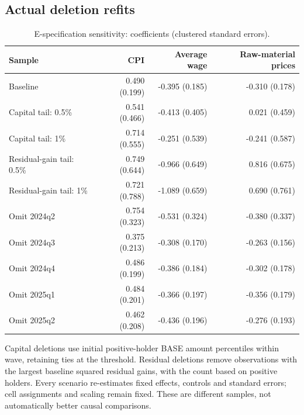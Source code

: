 \subsection{Actual deletion refits}
\begin{table}[H]
\centering
\small
\setlength{\tabcolsep}{4pt}
\caption{E-specification sensitivity: coefficients (clustered standard errors).}
\begin{tabular}{lrrr}
\toprule
Sample & CPI & Average wage & Raw-material prices \\
\midrule
Baseline & 0.490 (0.199) & -0.395 (0.185) & -0.310 (0.178) \\
Capital tail: 0.5\% & 0.541 (0.466) & -0.413 (0.405) & 0.021 (0.459) \\
Capital tail: 1\% & 0.714 (0.555) & -0.251 (0.539) & -0.241 (0.587) \\
Residual-gain tail: 0.5\% & 0.749 (0.644) & -0.966 (0.649) & 0.816 (0.675) \\
Residual-gain tail: 1\% & 0.721 (0.788) & -1.089 (0.659) & 0.690 (0.761) \\
Omit 2024q2 & 0.754 (0.323) & -0.531 (0.324) & -0.380 (0.337) \\
Omit 2024q3 & 0.375 (0.213) & -0.308 (0.170) & -0.263 (0.156) \\
Omit 2024q4 & 0.486 (0.199) & -0.386 (0.184) & -0.302 (0.178) \\
Omit 2025q1 & 0.484 (0.201) & -0.366 (0.197) & -0.356 (0.179) \\
Omit 2025q2 & 0.462 (0.208) & -0.436 (0.196) & -0.276 (0.193) \\
\bottomrule
\end{tabular}
\end{table}
\noindent\small Capital deletions use initial positive-holder BASE amount percentiles within wave, retaining ties at the threshold. Residual deletions remove observations with the largest baseline squared residual gains, with the count based on positive holders. Every scenario re-estimates fixed effects, controls and standard errors; cell assignments and scaling remain fixed. These are different samples, not automatically better causal comparisons.\normalsize

